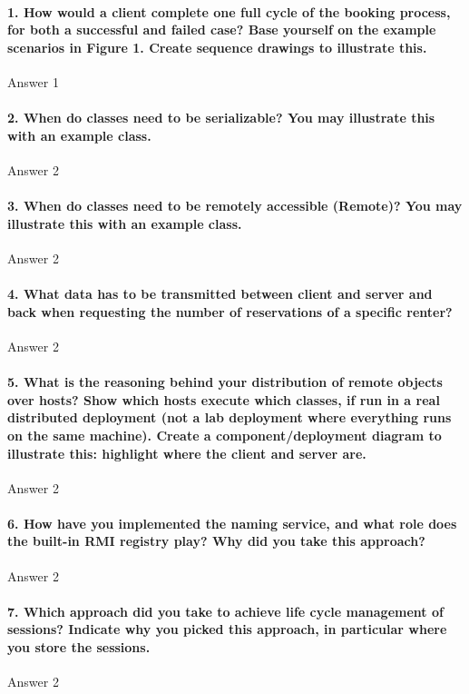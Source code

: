 \documentclass{ds-report}
\begin{document}
	\maketitle

	\paragraph{1. How would a client complete one full cycle of the booking process, for both a successful and
failed case? Base yourself on the example scenarios in Figure 1. Create sequence drawings to
illustrate this.} 
	Answer 1
	
	\paragraph{2. When do classes need to be serializable? You may illustrate this with an example class.} 
	Answer 2

	\paragraph{3. When do classes need to be remotely accessible (Remote)? You may illustrate this with an example
class.} 
	Answer 2

	\paragraph{4. What data has to be transmitted between client and server and back when requesting the number
of reservations of a specific renter?} 
	Answer 2

	\paragraph{5. What is the reasoning behind your distribution of remote objects over hosts? Show which
hosts execute which classes, if run in a real distributed deployment (not a lab deployment where
everything runs on the same machine). Create a component/deployment diagram to illustrate this:
highlight where the client and server are.} 
	Answer 2

	\paragraph{6. How have you implemented the naming service, and what role does the built-in RMI registry play?
Why did you take this approach?} 
	Answer 2

	\paragraph{7. Which approach did you take to achieve life cycle management of sessions? Indicate why you
picked this approach, in particular where you store the sessions.} 
	Answer 2
\end{document}
